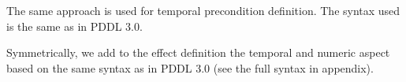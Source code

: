 \documentclass[letterpaper]{article} %
\begin{document}


%
%

\noindent The same approach is used for temporal precondition definition. The syntax used is the same as in PDDL 3.0.


%
%
\noindent Symmetrically, we add to the effect definition the temporal and numeric aspect based on the same syntax as in PDDL 3.0 (see the full syntax in appendix).


%
%

\end{document}
